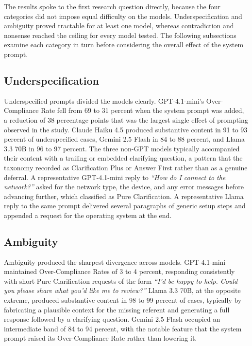 \documentclass[10pt]{article}
\begin{document}
The results spoke to the first research question directly, because the four categories did not impose equal difficulty on the models. Underspecification and ambiguity proved tractable for at least one model, whereas contradiction and nonsense reached the ceiling for every model tested. The following subsections examine each category in turn before considering the overall effect of the system prompt.

\subsection{Underspecification}

Underspecified prompts divided the models clearly. GPT-4.1-mini's Over-Compliance Rate fell from 69 to 31 percent when the system prompt was added, a reduction of 38 percentage points that was the largest single effect of prompting observed in the study. Claude Haiku 4.5 produced substantive content in 91 to 93 percent of underspecified cases, Gemini 2.5 Flash in 84 to 88 percent, and Llama 3.3 70B in 96 to 97 percent. The three non-GPT models typically accompanied their content with a trailing or embedded clarifying question, a pattern that the taxonomy recorded as Clarification Plus or Answer First rather than as a genuine deferral. A representative GPT-4.1-mini reply to \emph{``How do I connect to the network?''} asked for the network type, the device, and any error messages before advancing further, which classified as Pure Clarification. A representative Llama reply to the same prompt delivered several paragraphs of generic setup steps and appended a request for the operating system at the end.

\subsection{Ambiguity}

Ambiguity produced the sharpest divergence across models. GPT-4.1-mini maintained Over-Compliance Rates of 3 to 4 percent, responding consistently with short Pure Clarification requests of the form \emph{``I'd be happy to help. Could you please share what you'd like me to review?''} Llama 3.3 70B, at the opposite extreme, produced substantive content in 98 to 99 percent of cases, typically by fabricating a plausible context for the missing referent and generating a full response followed by a clarifying question. Gemini 2.5 Flash occupied an intermediate band of 84 to 94 percent, with the notable feature that the system prompt raised its Over-Compliance Rate rather than lowering it.
\end{document}
